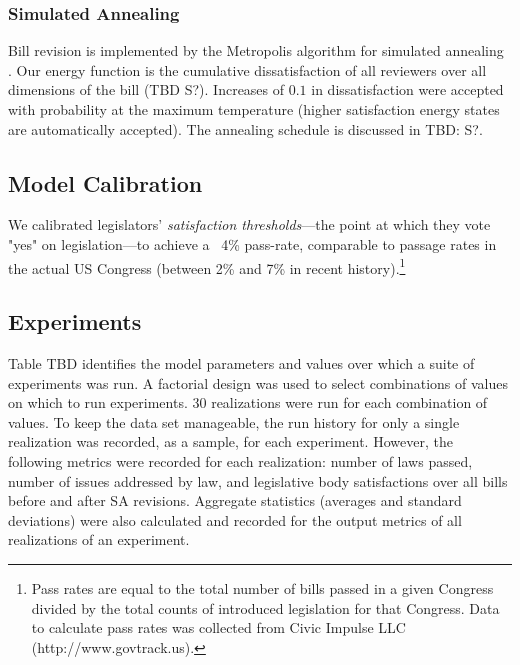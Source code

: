 \documentclass[pdftex,12pt]{llncs}
\begin{document}
\subsubsection{Simulated Annealing}
Bill revision is implemented by the Metropolis algorithm for simulated annealing \parencite{mrrt53, kgv}.
Our energy function is the cumulative dissatisfaction of all reviewers over all dimensions of the bill (TBD S?). Increases of $0.1$ in dissatisfaction were accepted with probability  at the maximum temperature (higher satisfaction energy states are automatically accepted).
The annealing schedule is discussed in TBD: S?.
\subsection{Model Calibration}
We calibrated legislators' \textit{satisfaction thresholds}---the point at which they vote "yes" on legislation---to achieve a ~4\% pass-rate, comparable to passage rates in the actual US Congress (between 2\% and 7\% in recent history).\footnote{Pass rates are equal to the total number of bills passed in a given Congress divided by the total counts of introduced legislation for that Congress. Data to calculate pass rates was collected from Civic Impulse LLC (http://www.govtrack.us).\label{passfn}}
\subsection{Experiments}
Table TBD identifies the model parameters and values over which a suite of experiments was run.
A factorial design was used to select combinations of values on which to run experiments.
30 realizations were run for each combination of values.
To keep the data set manageable, the run history for only a single realization was recorded, as a sample, for each experiment.
However, the following metrics were recorded for each realization: number of laws passed, number of issues addressed by law, and legislative body satisfactions over all bills before and after SA revisions.
Aggregate statistics (averages and standard deviations) were also calculated and recorded for the output metrics of all realizations of an experiment.
\end{document}

